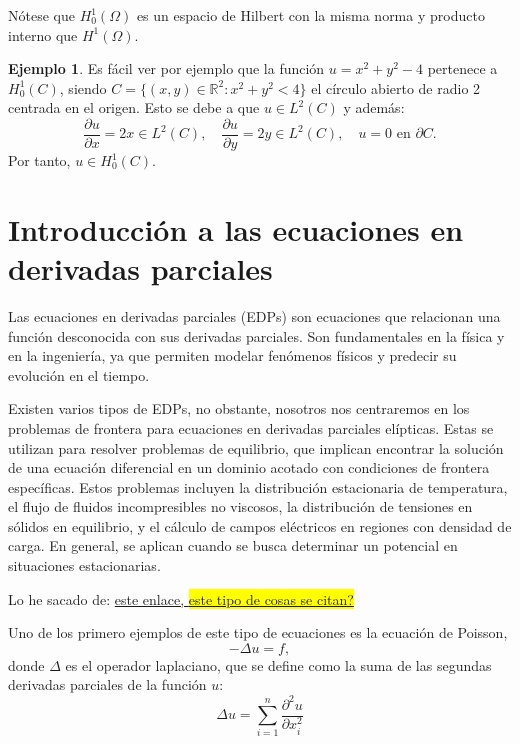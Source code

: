 \documentclass[a4paper,11pt,spanish, twoside, leqno]{tfg-uam}
\theoremstyle{definition}
\newtheorem{exmp}[teor]{Ejemplo}
\begin{document}
Nótese que $H_0^1(\Omega)$ es un espacio de Hilbert con la misma norma y producto interno que $H^1(\Omega)$.



\begin{exmp}
    Es fácil ver por ejemplo que la función $u = x^2 + y^2 - 4$ pertenece a $H^1_0(C)$, siendo $C = \{(x,y)\in \mathbb{R}^2: x^2 + y^2 < 4\}$ el círculo abierto de radio 2 centrada en el origen. Esto se debe a que $u\in L^2(C)$ y además:
    \begin{equation*}
        \frac{\partial u}{\partial x} = 2x\in L^2(C), \quad \frac{\partial u}{\partial y} = 2y \in L^2(C), \quad u=0\text{ en  } \partial C.
    \end{equation*}
    Por tanto, $u\in H_0^1(C)$.
\end{exmp}


\section{Introducción a las ecuaciones en derivadas parciales}

Las ecuaciones en derivadas parciales (EDPs) son ecuaciones que relacionan una función desconocida con sus derivadas parciales. Son fundamentales en la física y en la ingeniería, ya que permiten modelar fenómenos físicos y predecir su evolución en el tiempo. 

Existen varios tipos de EDPs, no obstante, nosotros nos centraremos en los problemas de frontera para ecuaciones en derivadas parciales elípticas. Estas se utilizan para resolver problemas de equilibrio, que implican encontrar la solución de una ecuación diferencial en un dominio acotado con condiciones de frontera específicas. Estos problemas incluyen la distribución estacionaria de temperatura, el flujo de fluidos incompresibles no viscosos, la distribución de tensiones en sólidos en equilibrio, y el cálculo de campos eléctricos en regiones con densidad de carga. En general, se aplican cuando se busca determinar un potencial en situaciones estacionarias. 

Lo he sacado de: \href{https://www.ugr.es/~prodelas/ftp/ETSICCP/Resoluci%F3nNum%E9ricaEDPs.pdf}{este enlace, \colorbox{yellow}{este tipo de cosas se citan?}}


Uno de los primero ejemplos de este tipo de ecuaciones es la ecuación de Poisson,
\begin{equation*}
    -\Delta  u = f,
\end{equation*}
donde $\Delta$ es el operador laplaciano, que se define como la suma de las segundas derivadas parciales de la función $u$:
\begin{equation*}
    \Delta u = \sum_{i=1}^{n}\frac{\partial^2 u}{\partial x_i^2}
\end{equation*}
\end{document}

